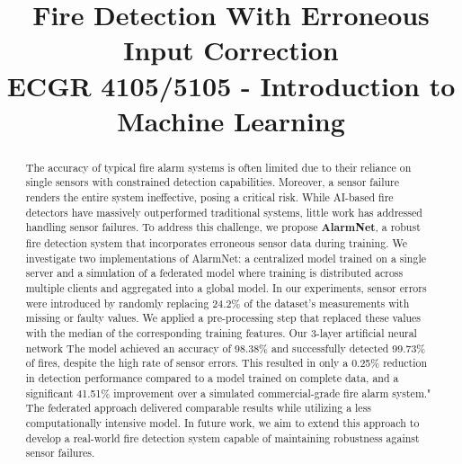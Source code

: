 \documentclass[conference]{IEEEtran}
\begin{document}
\title{ Fire Detection With Erroneous Input Correction\\
        { \footnotesize ECGR 4105/5105 - Introduction to
        Machine Learning} }

\author{ 
\and
{}
\and
{}
 }
\maketitle

\begin{abstract}
The accuracy of typical fire alarm systems is often limited
due to their reliance on single sensors with constrained
detection capabilities. Moreover, a sensor failure renders
the entire system ineffective, posing a critical risk. While
AI-based fire detectors have massively outperformed
traditional systems, little work has addressed handling
sensor failures. To address this challenge, we propose
\textbf{AlarmNet}, a robust fire detection system that
incorporates erroneous sensor data during training. We
investigate two implementations of AlarmNet: a centralized
model trained on a single server and a simulation of a
federated model where training is distributed across
multiple clients and aggregated into a global model. In our
experiments, sensor errors were introduced by randomly
replacing 24.2\% of the dataset’s measurements with missing
or faulty values. We applied a pre-processing step that
replaced these values with the median of the corresponding
training features. Our 3-layer artificial neural network The
model achieved an accuracy of 98.38\% and successfully
detected 99.73\% of fires, despite the high rate of sensor
errors. This resulted in only a 0.25\% reduction in
detection performance compared to a model trained on
complete data, and a significant 41.51\% improvement over a
simulated commercial-grade fire alarm system." The federated
approach delivered comparable results while utilizing a less
computationally intensive model. In future work, we aim to
extend this approach to develop a real-world fire detection
system capable of maintaining robustness against sensor
failures.
\end{abstract}
\end{document}
